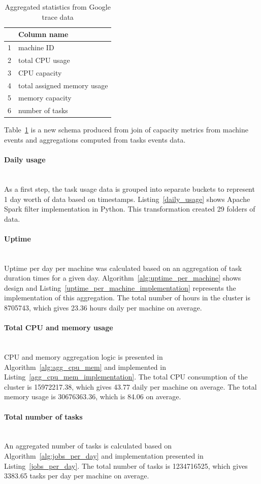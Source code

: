 \documentclass[]{final_report}
\newcommand{\myparagraph}[1]{\paragraph{#1}\mbox{}\\}
\begin{document}
\begin{table}[h]
\begin{center}
    \begin{tabular}{| l | l |}
    \hline
    & \textbf{Column name} \\
    \hline
    1& machine ID\\
    \hline
    2 & total CPU usage\\
     \hline
    3 & CPU capacity\\
     \hline
    4 & total assigned memory usage\\
     \hline
    5 & memory capacity\\
     \hline
    6 & number of tasks\\
    \hline
    \end{tabular}
\end{center}
\caption{Aggregated statistics from Google trace data}
\label{tab:new_schema}
\end{table}

Table~\ref{tab:new_schema} is a new schema produced from join of capacity metrics from machine events and aggregations computed from tasks events data. 

\myparagraph{Daily usage}
As a first step, the task usage data is grouped into separate buckets to represent 1 day worth of data based on timestamps. Listing~\ref{daily_usage} shows Apache Spark filter implementation in Python. This transformation created 29 folders of data.

\myparagraph{Uptime}
Uptime per day per machine was calculated based on an aggregation of task duration times for a given day. Algorithm~\ref{alg:uptime_per_machine} shows design and Listing~\ref{uptime_per_machine_implementation} represents the implementation of this aggregation. The total number of hours in the cluster is 8705743, which gives 23.36 hours daily per machine on average. 

\myparagraph{Total CPU and memory usage}
CPU and memory aggregation logic is presented in Algorithm~\ref{alg:agg_cpu_mem} and implemented in Listing~\ref{agg_cpu_mem_implementation}. The total CPU consumption of the cluster is 15972217.38, which gives 43.77 daily per machine on average. The total memory usage is 30676363.36, which is 84.06 on average. 

\myparagraph{Total number of tasks}
An aggregated number of tasks is calculated based on Algorithm~\ref{alg:jobs_per_day} and implementation presented in Listing~\ref{jobs_per_day}. The total number of tasks is 1234716525, which gives 3383.65 tasks per day per machine on average.
\end{document}
